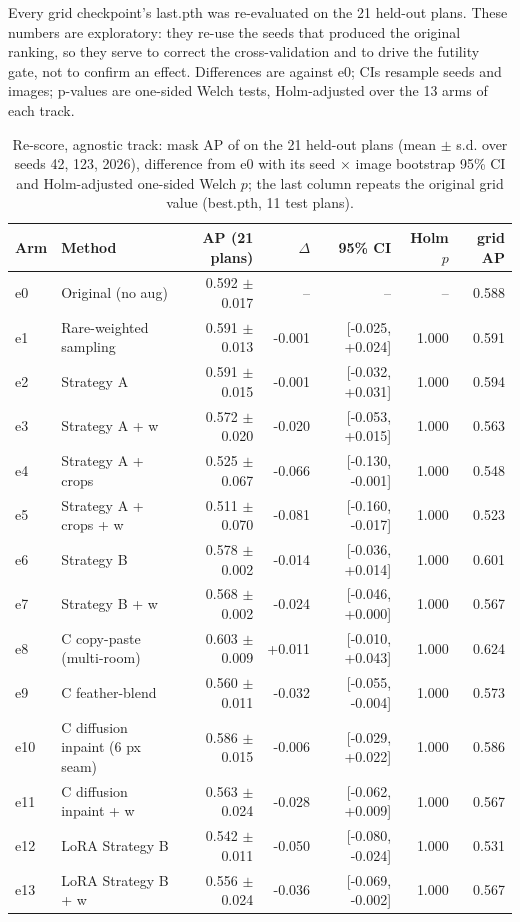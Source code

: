 Every grid checkpoint's last.pth was re-evaluated on the 21 held-out plans. These numbers are exploratory: they re-use the seeds that produced the original ranking, so they serve to correct the cross-validation and to drive the futility gate, not to confirm an effect. Differences are against e0; CIs resample seeds and images; p-values are one-sided Welch tests, Holm-adjusted over the 13 arms of each track.

\begin{table}[H]
\centering
\caption{Re-score, agnostic track: mask AP of  on the 21 held-out plans (mean $\pm$ s.d. over seeds 42, 123, 2026), difference from e0 with its seed $\times$ image bootstrap 95\% CI and Holm-adjusted one-sided Welch $p$; the last column repeats the original grid value (best.pth, 11 test plans).}
\label{tab:rescoreagnostic}
\small
\begin{tabular}{@{}llrrrrr@{}}
\toprule
Arm & Method & AP (21 plans) & $\Delta$ & 95\% CI & Holm $p$ & grid AP \\
\midrule
e0 & Original (no aug) & 0.592 $\pm$ 0.017 & -- & -- & -- & 0.588 \\
e1 & Rare-weighted sampling & 0.591 $\pm$ 0.013 & -0.001 & [-0.025, +0.024] & 1.000 & 0.591 \\
e2 & Strategy A & 0.591 $\pm$ 0.015 & -0.001 & [-0.032, +0.031] & 1.000 & 0.594 \\
e3 & Strategy A + w & 0.572 $\pm$ 0.020 & -0.020 & [-0.053, +0.015] & 1.000 & 0.563 \\
e4 & Strategy A + crops & 0.525 $\pm$ 0.067 & -0.066 & [-0.130, -0.001] & 1.000 & 0.548 \\
e5 & Strategy A + crops + w & 0.511 $\pm$ 0.070 & -0.081 & [-0.160, -0.017] & 1.000 & 0.523 \\
e6 & Strategy B & 0.578 $\pm$ 0.002 & -0.014 & [-0.036, +0.014] & 1.000 & 0.601 \\
e7 & Strategy B + w & 0.568 $\pm$ 0.002 & -0.024 & [-0.046, +0.000] & 1.000 & 0.567 \\
e8 & C copy-paste (multi-room) & 0.603 $\pm$ 0.009 & +0.011 & [-0.010, +0.043] & 1.000 & 0.624 \\
e9 & C feather-blend & 0.560 $\pm$ 0.011 & -0.032 & [-0.055, -0.004] & 1.000 & 0.573 \\
e10 & C diffusion inpaint (6 px seam) & 0.586 $\pm$ 0.015 & -0.006 & [-0.029, +0.022] & 1.000 & 0.586 \\
e11 & C diffusion inpaint + w & 0.563 $\pm$ 0.024 & -0.028 & [-0.062, +0.009] & 1.000 & 0.567 \\
e12 & LoRA Strategy B & 0.542 $\pm$ 0.011 & -0.050 & [-0.080, -0.024] & 1.000 & 0.531 \\
e13 & LoRA Strategy B + w & 0.556 $\pm$ 0.024 & -0.036 & [-0.069, -0.002] & 1.000 & 0.567 \\
\bottomrule
\end{tabular}
\end{table}

